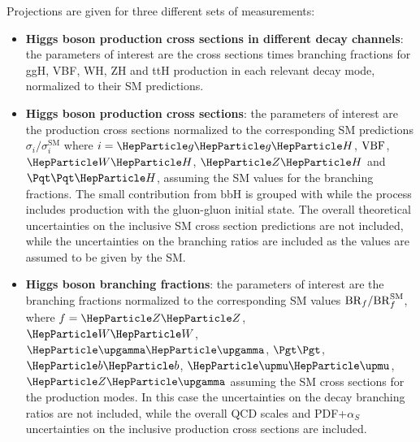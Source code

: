 

Projections are given for three different sets of measurements:
\begin{itemize}
    \item \textbf{Higgs boson production cross sections in different decay channels}: the parameters of interest are the cross sections times branching fractions for ggH, VBF, WH, ZH and ttH production in each relevant decay mode, normalized to their SM predictions.
    \item \textbf{Higgs boson production cross sections}:  the parameters of interest are the production cross sections normalized to the corresponding SM predictions  $\sigma_{i}/\sigma_{i}^{\mathrm{SM}}$  where $i=\ggh$, $\mathrm{VBF}$, $\wh$, $\zh$ and $\tth$, assuming the SM values for the branching fractions. The small contribution from bbH is grouped with \ggh while the \zh process includes \zh production with the gluon-gluon initial state. The overall theoretical uncertainties on the inclusive SM cross section predictions are not included, while the uncertainties on the branching ratios are included as the values are assumed to be given by the SM.
    \item \textbf{Higgs boson branching fractions}: the parameters of interest are the branching fractions normalized to the corresponding SM values ${\rm BR}_{f}/{\rm BR}_{f}^{\mathrm{SM}}$, where $f = \zz$, $\ww$, $\PGg\PGg$, $\tautau$, $\bb$, $\mumu$, $\PZ\PGg$ assuming the SM cross sections for the production modes. In this case  the uncertainties on the decay branching ratios are not included, while the overall QCD scales and PDF+$\alpha_{S}$ uncertainties on the inclusive production cross sections are included.

\end{itemize}

